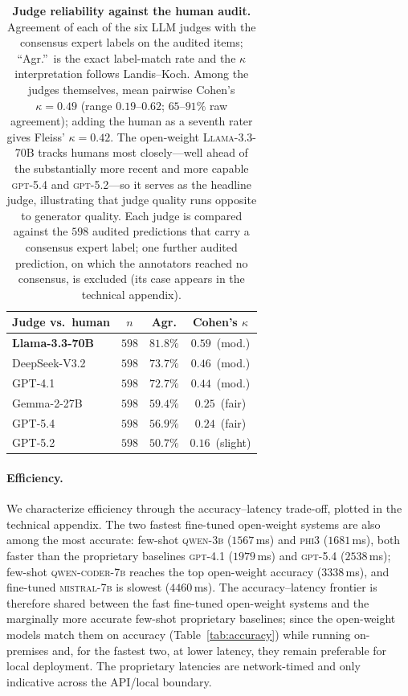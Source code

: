 \begin{table}[t]
\centering
\small
\begin{tabular}{@{}lccc@{}}
\toprule
\textbf{Judge vs.\ human} & $n$ & \textbf{Agr.} & \textbf{Cohen's} $\kappa$ \\
\midrule
\textbf{Llama-3.3-70B} & $598$ & $\mathbf{81.8\%}$ & $\mathbf{0.59}$~(mod.) \\
DeepSeek-V3.2 & $598$ & $73.7\%$ & $0.46$~(mod.) \\
GPT-4.1       & $598$ & $72.7\%$ & $0.44$~(mod.) \\
Gemma-2-27B   & $598$ & $59.4\%$ & $0.25$~(fair) \\
GPT-5.4       & $598$ & $56.9\%$ & $0.24$~(fair) \\
GPT-5.2       & $598$ & $50.7\%$ & $0.16$~(slight) \\
\bottomrule
\end{tabular}
\caption{\textbf{Judge reliability against the human audit.} Agreement of each of the six LLM judges with the consensus expert labels on the audited items; ``Agr.''\ is the exact label-match rate and the $\kappa$ interpretation follows Landis--Koch. Among the judges themselves, mean pairwise Cohen's $\kappa=0.49$ (range $0.19$--$0.62$; $65$--$91\%$ raw agreement); adding the human as a seventh rater gives Fleiss' $\kappa=0.42$. The open-weight \textsc{Llama-3.3-70B} tracks humans most closely---well ahead of the substantially more recent and more capable \textsc{gpt-5.4} and \textsc{gpt-5.2}---so it serves as the headline judge, illustrating that judge quality runs opposite to generator quality. Each judge is compared against the $598$ audited predictions that carry a consensus expert label; one further audited prediction, on which the annotators reached no consensus, is excluded (its case appears in the technical appendix).}
\label{tab:judge_reliability}
\end{table}

\paragraph{Efficiency.}
We characterize efficiency through the accuracy--latency trade-off, plotted in the technical appendix. The two fastest fine-tuned open-weight systems are also among the most accurate: few-shot \textsc{qwen-3b} ($1567$\,ms) and \textsc{phi3} ($1681$\,ms), both faster than the proprietary baselines \textsc{gpt-4.1} ($1979$\,ms) and \textsc{gpt-5.4} ($2538$\,ms); few-shot \textsc{qwen-coder-7b} reaches the top open-weight accuracy ($3338$\,ms), and fine-tuned \textsc{mistral-7b} is slowest ($4460$\,ms). The accuracy--latency frontier is therefore shared between the fast fine-tuned open-weight systems and the marginally more accurate few-shot proprietary baselines; since the open-weight models match them on accuracy (Table~\ref{tab:accuracy}) while running on-premises and, for the fastest two, at lower latency, they remain preferable for local deployment. The proprietary latencies are network-timed and only indicative across the API/local boundary.

